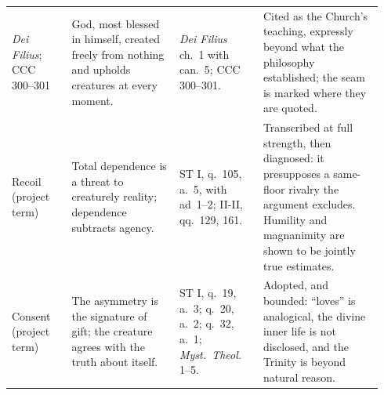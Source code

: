 \begin{longtable}{>{\raggedright\arraybackslash}p{0.155\linewidth}>{\raggedright\arraybackslash}p{0.275\linewidth}>{\raggedright\arraybackslash}p{0.215\linewidth}>{\raggedright\arraybackslash}p{0.30\linewidth}}
\emph{Dei Filius}; CCC 300--301 & God, most blessed in himself, created freely from nothing and upholds creatures at every moment. & \emph{Dei Filius} ch.~1 with can.~5; CCC 300--301. & Cited as the Church's teaching, expressly beyond what the philosophy established; the seam is marked where they are quoted.\\
Recoil (project term) & Total dependence is a threat to creaturely reality; dependence subtracts agency. & ST I, q.~105, a.~5, with ad~1--2; II-II, qq.~129, 161. & Transcribed at full strength, then diagnosed: it presupposes a same-floor rivalry the argument excludes. Humility and magnanimity are shown to be jointly true estimates.\\
Consent (project term) & The asymmetry is the signature of gift; the creature agrees with the truth about itself. & ST I, q.~19, a.~3; q.~20, a.~2; q.~32, a.~1; \emph{Myst.\ Theol.} 1--5. & Adopted, and bounded: ``loves'' is analogical, the divine inner life is not disclosed, and the Trinity is beyond natural reason.\\
\end{longtable}
\endgroup
